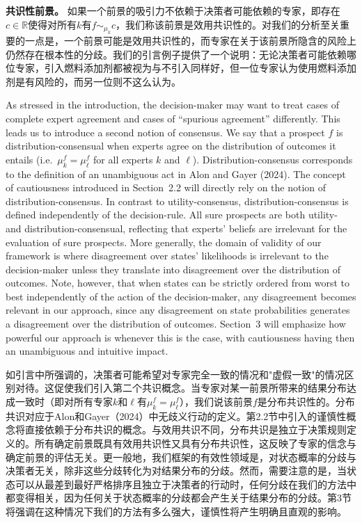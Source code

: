 \documentclass[12pt,a4paper]{article}
\newenvironment{original}
  {\par\noindent\ignorespaces}
  {\par}
\newenvironment{translation}
  {\par\noindent{\color{transblue}\ignorespaces}}
  {\par\medskip}
\newcommand{\R}{\mathbb{R}}
\begin{document}
\begin{translation}
\textbf{共识性前景。} 如果一个前景的吸引力不依赖于决策者可能依赖的专家，即存在$c \in \R$使得对所有$k$有$f \sim_{\mu_{k}} c$，我们称该前景是效用共识性的。对我们的分析至关重要的一点是，一个前景可能是效用共识性的，而专家在关于该前景所隐含的风险上仍然存在根本性的分歧。我们的引言例子提供了一个说明：无论决策者可能依赖哪位专家，引入燃料添加剂都被视为与不引入同样好，但一位专家认为使用燃料添加剂是有风险的，而另一位则不这么认为。
\end{translation}

\begin{original}
As stressed in the introduction, the decision-maker may want to treat cases of complete expert agreement and cases of ``spurious agreement'' differently. This leads us to introduce a second notion of consensus. We say that a prospect $f$ is distribution-consensual when experts agree on the distribution of outcomes it entails (i.e.\ $\mu_{k}^{f} = \mu_{\ell}^{f}$ for all experts $k$ and $\ell$). Distribution-consensus corresponds to the definition of an unambiguous act in Alon and Gayer (2024). The concept of cautiousness introduced in Section~2.2 will directly rely on the notion of distribution-consensus. In contrast to utility-consensus, distribution-consensus is defined independently of the decision-rule. All sure prospects are both utility- and distribution-consensual, reflecting that experts' beliefs are irrelevant for the evaluation of sure prospects. More generally, the domain of validity of our framework is where disagreement over states' likelihoods is irrelevant to the decision-maker unless they translate into disagreement over the distribution of outcomes. Note, however, that when states can be strictly ordered from worst to best independently of the action of the decision-maker, any disagreement becomes relevant in our approach, since any disagreement on state probabilities generates a disagreement over the distribution of outcomes. Section~3 will emphasize how powerful our approach is whenever this is the case, with cautiousness having then an unambiguous and intuitive impact.
\end{original}

\begin{translation}
如引言中所强调的，决策者可能希望对专家完全一致的情况和"虚假一致"的情况区别对待。这促使我们引入第二个共识概念。当专家对某一前景所带来的结果分布达成一致时（即对所有专家$k$和$\ell$有$\mu_{k}^{f} = \mu_{\ell}^{f}$），我们说该前景$f$是分布共识性的。分布共识对应于Alon和Gayer（2024）中无歧义行动的定义。第2.2节中引入的谨慎性概念将直接依赖于分布共识的概念。与效用共识不同，分布共识是独立于决策规则定义的。所有确定前景既具有效用共识性又具有分布共识性，这反映了专家的信念与确定前景的评估无关。更一般地，我们框架的有效性领域是，对状态概率的分歧与决策者无关，除非这些分歧转化为对结果分布的分歧。然而，需要注意的是，当状态可以从最差到最好严格排序且独立于决策者的行动时，任何分歧在我们的方法中都变得相关，因为任何关于状态概率的分歧都会产生关于结果分布的分歧。第3节将强调在这种情况下我们的方法有多么强大，谨慎性将产生明确且直观的影响。
\end{translation}
\end{document}
